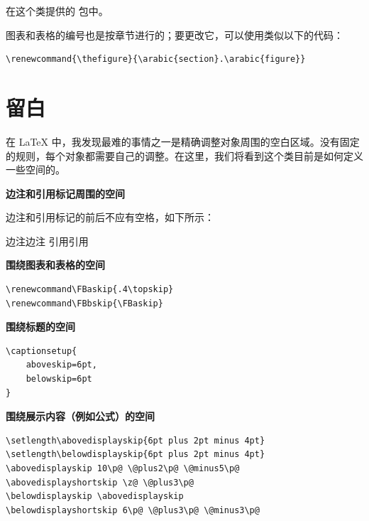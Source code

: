 在这个类提供的  包中。

图表和表格的编号也是按章节进行的；要更改它，可以使用类似以下的代码：

\begin{lstlisting}[style=kaolstplain]
\renewcommand{\thefigure}{\arabic{section}.\arabic{figure}}
\end{lstlisting}

\section{留白}

在 \LaTeX\xspace 中，我发现最难的事情之一是精确调整对象周围的空白区域。没有固定的规则，每个对象都需要自己的调整。在这里，我们将看到这个类目前是如何定义一些空间的。

\textbf{边注和引用标记周围的空间}

边注和引用标记的前后不应有空格，如下所示：

边注边注\newline
引用\cite{James2013}引用

\textbf{围绕图表和表格的空间}

\begin{lstlisting}[style=kaolstplain]
\renewcommand\FBaskip{.4\topskip}
\renewcommand\FBbskip{\FBaskip}
\end{lstlisting}

\textbf{围绕标题的空间}

\begin{lstlisting}[style=kaolstplain]
\captionsetup{
	aboveskip=6pt,
	belowskip=6pt
}
\end{lstlisting}

\textbf{围绕展示内容（例如公式）的空间}

\begin{lstlisting}[style=kaolstplain]
\setlength\abovedisplayskip{6pt plus 2pt minus 4pt}
\setlength\belowdisplayskip{6pt plus 2pt minus 4pt}
\abovedisplayskip 10\p@ \@plus2\p@ \@minus5\p@
\abovedisplayshortskip \z@ \@plus3\p@
\belowdisplayskip \abovedisplayskip
\belowdisplayshortskip 6\p@ \@plus3\p@ \@minus3\p@
\end{lstlisting}

